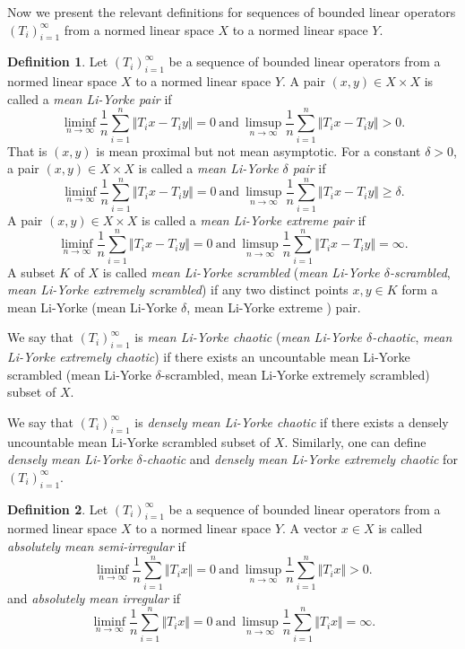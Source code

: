 \documentclass[12pt,a4paper]{amsart}
\theoremstyle{definition}
\newtheorem{defn}{Definition}[section]
\theoremstyle{plain}
\begin{document}
 Now we present the relevant definitions for sequences of bounded linear operators $(T_i)_{i=1}^{\infty}$ from a normed linear space $X$ to a normed linear space $Y$. 
\begin{defn}
    Let $(T_i)_{i=1}^{\infty}$ be a sequence of bounded linear operators from a normed linear space $X$ to a normed linear space $Y$.
    A pair $(x,y)\in X\times X$ is called a \emph{mean Li-Yorke pair} if
    \[
        \liminf_{n\to \infty} \frac{1}{n} \sum_{i=1}^{n} \Vert T_ix-T_iy \Vert =0 \ \text{and} \
        \limsup_{n\to \infty} \frac{1}{n} \sum_{i=1}^{n} \Vert T_ix-T_iy \Vert >0.
    \]
    That is $(x,y)$ is mean proximal but not mean asymptotic.
    For a constant $\delta>0$, a pair $(x,y)\in X\times X$ is called a \emph{mean Li-Yorke $\delta$ pair} if
    \[
        \liminf_{n\to \infty} \frac{1}{n} \sum_{i=1}^{n} \Vert T_ix-T_iy \Vert =0 \ \text{and} \
        \limsup_{n\to \infty} \frac{1}{n} \sum_{i=1}^{n} \Vert T_ix-T_iy \Vert \geq \delta.
    \]
    A pair $(x,y)\in X\times X$ is called a \emph{mean Li-Yorke extreme pair} if
    \[
        \liminf_{n\to \infty} \frac{1}{n} \sum_{i=1}^{n} \Vert T_ix-T_iy \Vert =0 \ \text{and} \
        \limsup_{n\to \infty} \frac{1}{n} \sum_{i=1}^{n} \Vert T_ix-T_iy \Vert =\infty.
    \]
    A subset $K$ of $X$ is called \emph{mean Li-Yorke scrambled} (\emph{mean Li-Yorke $\delta$-scrambled}, \emph{mean Li-Yorke extremely scrambled}) if any two distinct points $x,y\in K$ form a mean Li-Yorke (mean Li-Yorke $\delta$, mean Li-Yorke extreme ) pair.

    We say that $(T_i)_{i=1}^{\infty}$ is \emph{mean Li-Yorke chaotic} (\emph{mean Li-Yorke $\delta$-chaotic}, \emph{mean Li-Yorke extremely chaotic}) if there exists an uncountable mean Li-Yorke scrambled (mean Li-Yorke $\delta$-scrambled, mean Li-Yorke extremely scrambled) subset of $X$.

    We say that $(T_i)_{i=1}^{\infty}$ is \emph{densely mean Li-Yorke chaotic} if there exists a densely uncountable mean Li-Yorke scrambled subset of $X$. Similarly, one can define \emph{densely mean Li-Yorke $\delta$-chaotic} and \emph{densely mean Li-Yorke extremely chaotic} for $(T_i)_{i=1}^{\infty}$.
\end{defn}

\begin{defn}
    Let $(T_i)_{i=1}^{\infty}$ be a sequence of bounded linear operators from a normed linear space $X$ to a normed linear space $Y$. A vector $x\in X$ is called \emph{absolutely mean semi-irregular} if
    \[
        \liminf_{n\to \infty} \frac{1}{n} \sum_{i=1}^{n} \Vert T_ix \Vert =0 \ \text{and} \
        \limsup_{n\to \infty} \frac{1}{n} \sum_{i=1}^{n} \Vert T_ix \Vert >0.
    \]
    and \emph{absolutely mean irregular} if
    \[
        \liminf_{n\to \infty} \frac{1}{n} \sum_{i=1}^{n} \Vert T_ix \Vert =0 \ \text{and} \
        \limsup_{n\to \infty} \frac{1}{n} \sum_{i=1}^{n} \Vert T_ix \Vert =\infty.
    \]
\end{defn}
\end{document}
